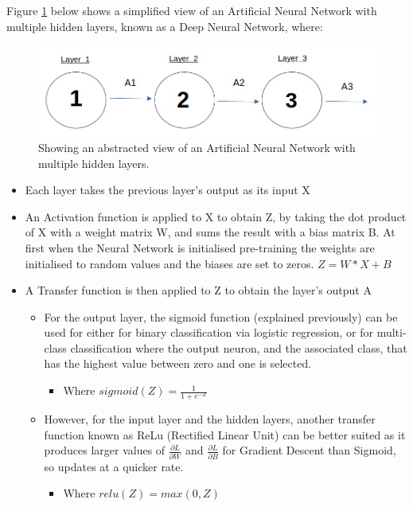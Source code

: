 \documentclass[./project-report/src/latex/project-report.tex]{subfiles}
\begin{document}
Figure \ref{fig:abstract-network} below shows a simplified view of an Artificial Neural Network with multiple hidden layers, known as a Deep Neural Network, where:

\pagebreak

\begin{figure}[h!]
\centering
\includegraphics[width=1\textwidth]{./project-report/src/images/deep-ann-diagram.png}
\caption{Showing an abstracted view of an Artificial Neural Network with multiple hidden layers.}
\label{fig:abstract-network}
\end{figure}

\begin{itemize}
    \item Each layer takes the previous layer's output as its input X
    \item An Activation function is applied to X to obtain Z, by taking the dot product of X with a weight matrix W, and sums the result with a bias matrix B. At 
          first when the Neural Network is initialised pre-training the weights are initialised to random values and the biases are set to zeros.
          $Z = W * X + B$
    \item A Transfer function is then applied to Z to obtain the layer's output A
    \begin{itemize}
        \item For the output layer, the sigmoid function (explained previously) can be used for either for binary classification via logistic regression, or for multi-
              class classification where the output neuron, and the associated class, that has the highest value between zero and one is selected.
        \begin{itemize}
            \item Where $sigmoid(Z) = \frac{1}{1+e^{-Z}}$
        \end{itemize}
        \item However, for the input layer and the hidden layers, another transfer function known as ReLu (Rectified Linear Unit) can be better suited as it produces 
              larger values of $\frac{\partial{L}}{\partial{W}}$ and $\frac{\partial{L}}{\partial{B}}$ for Gradient Descent than Sigmoid, so updates at a quicker rate.
        \begin{itemize}
            \item Where $relu(Z) = max(0, Z)$
        \end{itemize}
    \end{itemize}
\end{itemize}
\end{document}
